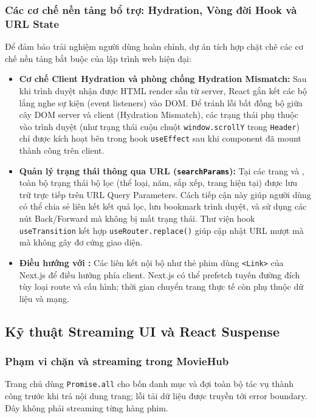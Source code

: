 \documentclass[12pt,a4paper]{extarticle}
\begin{document}
\subsubsection{Các cơ chế nền tảng bổ trợ: Hydration, Vòng đời Hook và URL State}
Để đảm bảo trải nghiệm người dùng hoàn chỉnh, dự án tích hợp chặt chẽ các cơ chế nền tảng bắt buộc của lập trình web hiện đại:
\begin{itemize}[noitemsep]
    \item \textbf{Cơ chế Client Hydration và phòng chống Hydration Mismatch:} Sau khi trình duyệt nhận được HTML render sẵn từ server, React gắn kết các bộ lắng nghe sự kiện (event listeners) vào DOM. Để tránh lỗi bất đồng bộ giữa cây DOM server và client (Hydration Mismatch), các trạng thái phụ thuộc vào trình duyệt (như trạng thái cuộn chuột \texttt{window.scrollY} trong \texttt{Header}) chỉ được kích hoạt bên trong hook \texttt{useEffect} sau khi component đã mount thành công trên client.
    \item \textbf{Quản lý trạng thái thông qua URL (\texttt{searchParams}):} Tại các trang  và , toàn bộ trạng thái bộ lọc (thể loại, năm, sắp xếp, trang hiện tại) được lưu trữ trực tiếp trên URL Query Parameters. Cách tiếp cận này giúp người dùng có thể chia sẻ liên kết kết quả lọc, lưu bookmark trình duyệt, và sử dụng các nút Back/Forward mà không bị mất trạng thái. Thư viện hook \texttt{useTransition} kết hợp \texttt{useRouter.replace()} giúp cập nhật URL mượt mà mà không gây đơ cứng giao diện.
    \item \textbf{Điều hướng với :} Các liên kết nội bộ như thẻ phim dùng \texttt{<Link>} của Next.js để điều hướng phía client. Next.js có thể prefetch tuyến đường đích tùy loại route và cấu hình; thời gian chuyển trang thực tế còn phụ thuộc dữ liệu và mạng.
\end{itemize}

\subsection{Kỹ thuật Streaming UI và React Suspense}

\subsubsection{Phạm vi chặn và streaming trong MovieHub}
Trang chủ dùng \texttt{Promise.all} cho bốn danh mục và đợi toàn bộ tác vụ thành công trước khi trả nội dung trang; lỗi tải dữ liệu được truyền tới error boundary. Đây không phải streaming từng hàng phim.
\end{document}
